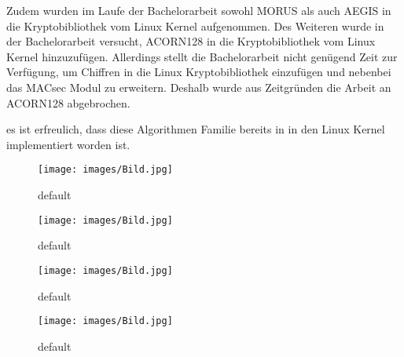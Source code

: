 Zudem wurden im Laufe der Bachelorarbeit sowohl MORUS als auch AEGIS in die Kryptobibliothek vom Linux Kernel aufgenommen. Des Weiteren wurde in der Bachelorarbeit versucht, ACORN128 in die Kryptobibliothek vom Linux Kernel hinzuzufügen. Allerdings stellt die Bachelorarbeit nicht genügend Zeit zur Verfügung, um Chiffren in die Linux Kryptobibliothek einzufügen und nebenbei das MACsec Modul zu erweitern. Deshalb wurde aus Zeitgründen die Arbeit an ACORN128 abgebrochen.

es ist erfreulich, dass diese Algorithmen Familie bereits in \cite{mosnavcekoptimizing} in den Linux Kernel implementiert worden ist.





\begin{figure}[ht]
\begin{minipage}[h]{0.45\linewidth}
\centering
\texttt{[image: images/Bild.jpg]}
\caption{default}
\label{fig:sample1}
\end{minipage}
\hspace{0.5cm}
\begin{minipage}[h]{0.45\linewidth}
\centering
\texttt{[image: images/Bild.jpg]}
\caption{default}
\label{fig:sample2}
\end{minipage}
\begin{minipage}[h]{0.45\linewidth}
\centering
\texttt{[image: images/Bild.jpg]}
\caption{default}
\label{fig:sample3}
\end{minipage}
\hspace{0.5cm}
\begin{minipage}[h]{0.45\linewidth}
\centering
\texttt{[image: images/Bild.jpg]}
\caption{default}
\label{fig:sample4}
\end{minipage}
\end{figure}